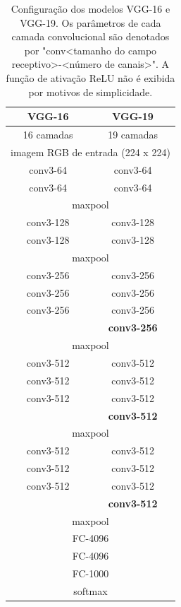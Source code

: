 \begin{table}[ht]
    \centering
    \footnotesize
    \begin{tabular}{|c|c|}
        \hline
        \textbf{VGG-16} & \textbf{VGG-19} \\
        \hline
        16 camadas & 19 camadas \\
        \hline
        \multicolumn{2}{|c|}{imagem RGB de entrada (224 x 224)} \\
        \hline
        conv3-64 & conv3-64 \\
        conv3-64 & conv3-64 \\
        \hline
        \multicolumn{2}{|c|}{maxpool} \\
        \hline
        conv3-128 & conv3-128 \\
        conv3-128 & conv3-128 \\
        \hline
        \multicolumn{2}{|c|}{maxpool} \\
        \hline
        conv3-256 & conv3-256 \\
        conv3-256 & conv3-256 \\
        conv3-256 & conv3-256 \\
         & \textbf{conv3-256} \\
        \hline
        \multicolumn{2}{|c|}{maxpool} \\
        \hline
        conv3-512 & conv3-512 \\
        conv3-512 & conv3-512 \\
        conv3-512 & conv3-512 \\
         & \textbf{conv3-512} \\
        \hline
        \multicolumn{2}{|c|}{maxpool} \\
        \hline
        conv3-512 & conv3-512 \\
        conv3-512 & conv3-512 \\
        conv3-512 & conv3-512 \\
         & \textbf{conv3-512} \\
        \hline
        \multicolumn{2}{|c|}{maxpool} \\
        \hline
        \multicolumn{2}{|c|}{FC-4096} \\
        \hline
        \multicolumn{2}{|c|}{FC-4096} \\
        \hline
        \multicolumn{2}{|c|}{FC-1000} \\
        \hline
        \multicolumn{2}{|c|}{softmax} \\
        \hline
    \end{tabular}
    \caption{Configuração dos modelos VGG-16 e VGG-19. Os parâmetros de cada camada convolucional são denotados por "conv<tamanho do campo receptivo>-<número de canais>". A função de ativação ReLU não é exibida por motivos de simplicidade.}
    \label{tab:vgg-arch}
\end{table}

